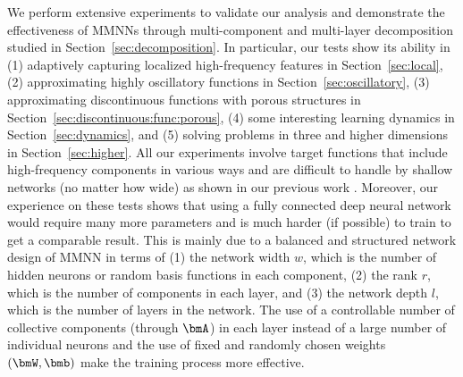 \documentclass[review,hidelinks,onefignum,onetabnum]{siamart250211}
\begin{document}
We perform extensive experiments to validate our analysis and demonstrate the effectiveness of MMNNs through multi-component and multi-layer decomposition studied in Section~\ref{sec:decomposition}. In particular, our tests show its ability in (1) adaptively capturing localized high-frequency features in Section~\ref{sec:local}, (2) approximating highly oscillatory functions in Section~\ref{sec:oscillatory}, 
(3) approximating discontinuous functions with porous structures in Section~\ref{sec:discontinuous:func:porous}, (4) some interesting learning dynamics in Section~\ref{sec:dynamics}, and 
(5) solving problems in three and higher dimensions in Section~\ref{sec:higher}.
All our experiments involve target functions that include high-frequency components in various ways and are difficult to handle by shallow networks (no matter how wide) as shown in our previous work \cite{ZZZZ-23}. Moreover, our experience on these tests shows that using a fully connected deep neural network would require many more parameters and is much harder (if possible) to train to get a comparable result. This is mainly due to a balanced and structured network design of MMNN in terms of (1) the network width $w$, which is the number of hidden neurons or random basis functions in each component, (2) the rank $r$, which is the number of components in each layer, and (3) the network depth $l$, which is the number of layers in the network. The use of a controllable number of collective components (through $\bmA$) in each layer instead of a large number of individual neurons and the use of fixed and randomly chosen weights $(\bmW,\bmb)$ make the training process more effective.
\end{document}

